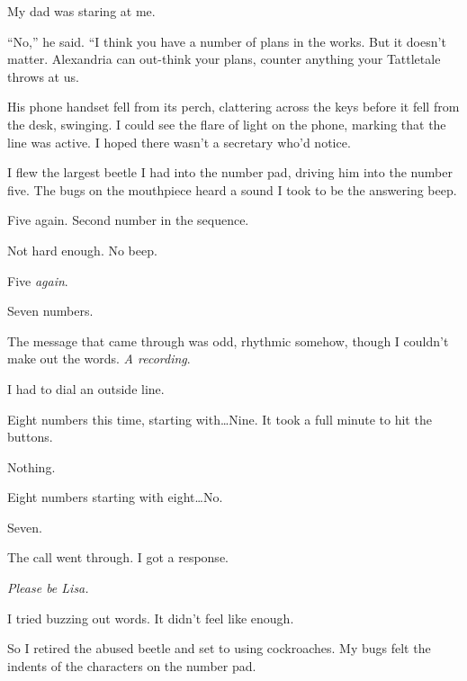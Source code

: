 My dad was staring at me.



``No,'' he said.  ``I think you have a number of plans in the works.  But it doesn't matter.  Alexandria can out-think your plans, counter anything your Tattletale throws at us.



His phone handset fell from its perch, clattering across the keys before it fell from the desk, swinging.  I could see the flare of light on the phone, marking that the line was active.  I hoped there wasn't a secretary who'd notice.



I flew the largest beetle I had into the number pad, driving him into the number five.  The bugs on the mouthpiece heard a sound I took to be the answering beep.



Five again.  Second number in the sequence.



Not hard enough.  No beep.



Five \emph{again}.



Seven numbers.



The message that came through was odd, rhythmic somehow, though I couldn't make out the words.  \emph{A recording}.



I had to dial an outside line.



Eight numbers this time, starting with\ldots Nine.  It took a full minute to hit the buttons.



Nothing.



Eight numbers starting with eight\ldots  No.



Seven.



The call went through.  I got a response.



\emph{Please be Lisa.}



I tried buzzing out words.  It didn't feel like enough.



So I retired the abused beetle and set to using cockroaches.  My bugs felt the indents of the characters on the number pad.



